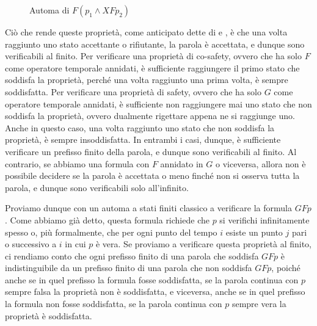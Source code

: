 \begin{figure}[H]
  \centering
  \caption{Automa di \(F(p_1 \land XF p_2)\)}\label{fig:example_nested}
\end{figure}

Ciò che rende queste proprietà, come anticipato dette di  e , è che una volta raggiunto uno stato accettante o rifiutante, la parola è accettata, e dunque sono verificabili al finito. Per verificare una proprietà di co-safety, ovvero che ha solo \(F\) come operatore temporale annidati, è sufficiente raggiungere il primo stato che soddisfa la proprietà, perché una volta raggiunto una prima volta, è sempre soddisfatta. Per verificare una proprietà di safety, ovvero che ha solo \(G\) come operatore temporale annidati, è sufficiente non raggiungere mai uno stato che non soddisfa la proprietà, ovvero dualmente rigettare appena ne si raggiunge uno. Anche in questo caso, una volta raggiunto uno stato che non soddisfa la proprietà, è sempre insoddisfatta. In entrambi i casi, dunque, è sufficiente verificare un prefisso finito della parola, e dunque sono verificabili al finito. Al contrario, se abbiamo una formula con \(F\) annidato in \(G\) o viceversa, allora non è possibile decidere se la parola è accettata o meno finché non si osserva tutta la parola, e dunque sono verificabili solo all'infinito.

Proviamo dunque con un automa a stati finiti classico a verificare la formula \(GF p\). Come abbiamo già detto, questa formula richiede che \(p\) si verifichi infinitamente spesso o, più formalmente, che per ogni punto del tempo \(i\) esiste un punto \(j\) pari o successivo a \(i\) in cui \(p\) è vera. Se proviamo a verificare questa proprietà al finito, ci rendiamo conto che ogni prefisso finito di una parola che soddisfa \(GF p\) è indistinguibile da un prefisso finito di una parola che non soddisfa \(GF p\), poiché anche se in quel prefisso la formula fosse soddisfatta, se la parola continua con \(p\) sempre falsa la proprietà non è soddisfatta, e viceversa, anche se in quel prefisso la formula non fosse soddisfatta, se la parola continua con \(p\) sempre vera la proprietà è soddisfatta.

